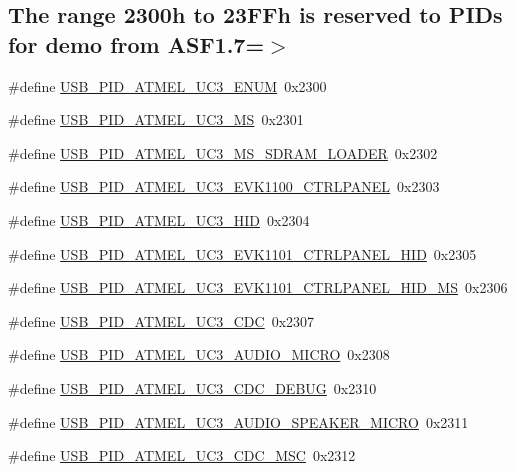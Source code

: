 \subsection*{\-The range 2300h to 23\-F\-Fh is reserved to \-P\-I\-Ds for demo from \-A\-S\-F1.7=$>$}
\begin{DoxyCompactItemize}
\item 
\#define \hyperlink{group__usb__atmel__ids__group_ga03434816426bc21bbb384f9afe149f1e}{\-U\-S\-B\-\_\-\-P\-I\-D\-\_\-\-A\-T\-M\-E\-L\-\_\-\-U\-C3\-\_\-\-E\-N\-U\-M}~0x2300
\item 
\#define \hyperlink{group__usb__atmel__ids__group_ga3c3a8d8fc6c2d20b05e44b34a38c5159}{\-U\-S\-B\-\_\-\-P\-I\-D\-\_\-\-A\-T\-M\-E\-L\-\_\-\-U\-C3\-\_\-\-M\-S}~0x2301
\item 
\#define \hyperlink{group__usb__atmel__ids__group_gaf5cf42327c8324b093b5a247d472b525}{\-U\-S\-B\-\_\-\-P\-I\-D\-\_\-\-A\-T\-M\-E\-L\-\_\-\-U\-C3\-\_\-\-M\-S\-\_\-\-S\-D\-R\-A\-M\-\_\-\-L\-O\-A\-D\-E\-R}~0x2302
\item 
\#define \hyperlink{group__usb__atmel__ids__group_ga5abb96a63cda4c7fb60a5d56fe2158b2}{\-U\-S\-B\-\_\-\-P\-I\-D\-\_\-\-A\-T\-M\-E\-L\-\_\-\-U\-C3\-\_\-\-E\-V\-K1100\-\_\-\-C\-T\-R\-L\-P\-A\-N\-E\-L}~0x2303
\item 
\#define \hyperlink{group__usb__atmel__ids__group_gae36d78d28923e15b4b58680c05d93946}{\-U\-S\-B\-\_\-\-P\-I\-D\-\_\-\-A\-T\-M\-E\-L\-\_\-\-U\-C3\-\_\-\-H\-I\-D}~0x2304
\item 
\#define \hyperlink{group__usb__atmel__ids__group_ga90ee7ee99e3d7eecb8eeccc1e233eb0b}{\-U\-S\-B\-\_\-\-P\-I\-D\-\_\-\-A\-T\-M\-E\-L\-\_\-\-U\-C3\-\_\-\-E\-V\-K1101\-\_\-\-C\-T\-R\-L\-P\-A\-N\-E\-L\-\_\-\-H\-I\-D}~0x2305
\item 
\#define \hyperlink{group__usb__atmel__ids__group_gad52a705633f06df68872d5b5f1184b15}{\-U\-S\-B\-\_\-\-P\-I\-D\-\_\-\-A\-T\-M\-E\-L\-\_\-\-U\-C3\-\_\-\-E\-V\-K1101\-\_\-\-C\-T\-R\-L\-P\-A\-N\-E\-L\-\_\-\-H\-I\-D\-\_\-\-M\-S}~0x2306
\item 
\#define \hyperlink{group__usb__atmel__ids__group_gac2efd8861d003f7b5933abbe604b7ea1}{\-U\-S\-B\-\_\-\-P\-I\-D\-\_\-\-A\-T\-M\-E\-L\-\_\-\-U\-C3\-\_\-\-C\-D\-C}~0x2307
\item 
\#define \hyperlink{group__usb__atmel__ids__group_ga02ed0d32e8e439ad888dbe84fadb8aaa}{\-U\-S\-B\-\_\-\-P\-I\-D\-\_\-\-A\-T\-M\-E\-L\-\_\-\-U\-C3\-\_\-\-A\-U\-D\-I\-O\-\_\-\-M\-I\-C\-R\-O}~0x2308
\item 
\#define \hyperlink{group__usb__atmel__ids__group_gaa61c3875223bb266b9ad2c15e9bcd446}{\-U\-S\-B\-\_\-\-P\-I\-D\-\_\-\-A\-T\-M\-E\-L\-\_\-\-U\-C3\-\_\-\-C\-D\-C\-\_\-\-D\-E\-B\-U\-G}~0x2310
\item 
\#define \hyperlink{group__usb__atmel__ids__group_ga010990fba35831f6098e8b612734540c}{\-U\-S\-B\-\_\-\-P\-I\-D\-\_\-\-A\-T\-M\-E\-L\-\_\-\-U\-C3\-\_\-\-A\-U\-D\-I\-O\-\_\-\-S\-P\-E\-A\-K\-E\-R\-\_\-\-M\-I\-C\-R\-O}~0x2311
\item 
\#define \hyperlink{group__usb__atmel__ids__group_ga127317fe6fdf787d27384ea41b316353}{\-U\-S\-B\-\_\-\-P\-I\-D\-\_\-\-A\-T\-M\-E\-L\-\_\-\-U\-C3\-\_\-\-C\-D\-C\-\_\-\-M\-S\-C}~0x2312
\end{DoxyCompactItemize}
